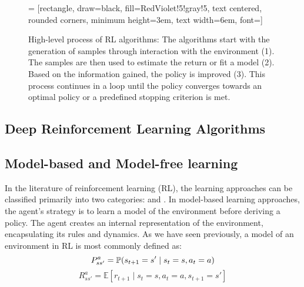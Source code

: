 \begin{figure}
    \centering
     = [rectangle, draw=black, fill=RedViolet!5!gray!5, text centered, rounded corners, minimum height=3em, text width=6em, font=\footnotesize]

    \caption{High-level process of RL algorithms: The algorithms start with the generation of samples through interaction with the environment (1). The samples are then used to estimate the return or fit a model (2). Based on the information gained, the policy is improved (3). This process continues in a loop until the policy converges towards an optimal policy or a predefined stopping criterion is met.}
    \label{fig:RL_process}
\end{figure}

\subsection{Deep Reinforcement Learning Algorithms}


\subsection{Model-based and Model-free learning}
In the literature of reinforcement learning (RL), the learning approaches can be classified primarily into two categories:  and  \cite{RL3}. In model-based learning approaches, the agent's strategy is to learn a model of the environment before deriving a policy. The agent creates an internal representation of the environment, encapsulating its rules and dynamics. As we have seen previously, a model of an environment in RL is most commonly defined as:
\[
P_{ss'}^{a} = \mathbb P(s_{t+1}=s' \mid s_t=s, a_t=a)
\]
\[R_{ss'}^{a} = \mathbb{E}[r_{t+1} \mid s_t=s, a_t=a, s_{t+1}=s']
\]


